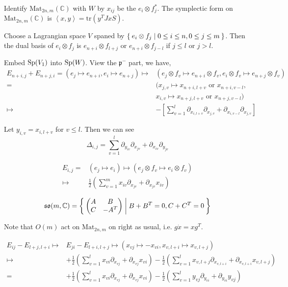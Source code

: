 \documentclass[12pt]{amsart}
\def\Mat{{\rm Mat}}
\def\bC{{\mathbb{C}}}
\def\inn#1#2{\left\langle{#1},{#2}\right\rangle}
\def\Sp{{\rm Sp}}
\def\aso{\mathfrak{so}}
\def\fpp{\mathfrak{p}}
\def\tr{\mathrm{tr}}
\def\Mat{\mathrm{Mat}}
\begin{document}
Identify $\Mat_{2n,m}(\bC)$ with $W$ by $x_{ij}$ be the $e_i\otimes f_j^*$.
The symplectic form on $\Mat_{2n,m}(\bC)$ is $\inn{x}{y} = \tr(y^TJxS)$.

Choose a Lagrangian space $V$ spaned by
$\Set{e_i\otimes f_j|0\leq i\leq n, 0\leq j \leq m}$.
Then the dual basis of $e_i\otimes f_j$ is 
$e_{n+i}\otimes f_{l+j}$ or $e_{n+i} \otimes f_{j-l}$ if $j\leq l$ or $j>l$. 

Embed $\Sp(V_1)$ into $\Sp(W)$. View the $\fpp^-$ part,
we have, 
\begin{align*}
 E_{n+i,j}+ E_{n+j,i} = (e_{j}\mapsto e_{n+i}, e_{i}\mapsto e_{n+j})  
\mapsto& (e_j\otimes f_v \mapsto e_{n+i}\otimes f_v,
 e_i\otimes f_v \mapsto e_{n+j}\otimes f_v)\\
 =&( x_{j,v}\mapsto x_{n+i,l+v}\text{ or } x_{n+i,v-l}, \\
 &x_{i,v}\mapsto x_{n+j,l+v}\text{ or } x_{n+j,v-l})\\
\mapsto& -[
\sum_{v=1}^l\partial_{x_{i,l+v}}\partial_{x_{j,v}} 
+ \partial_{x_{i,v-l}}\partial_{x_{j,v}}]
\end{align*}

Let $y_{i,v} = x_{i,l+v}$ for $v\leq l$.
Then we can see 
\[
\Delta_{i,j} = \sum_{v=1}^l \partial_{y_{iv}}\partial_{x_{jv}}
+ \partial_{x_{iv}}\partial_{y_{jv}}
\] 

\[
\begin{split}
E_{i,j} =& (e_j\mapsto e_i) \mapsto (e_j\otimes f_v \mapsto e_i\otimes f_v)\\
 \mapsto& \frac{1}{2}(\sum_{v=1}^m x_{iv}\partial_{x_{jv}}+ \partial_{x_{jv}}x_{iv}) 
\end{split}
\]

\[
\aso(m,\bC) = \Set{
\begin{pmatrix}
A & B\\
C & -A^T
\end{pmatrix}| B+B^T=0, C+C^T=0}
\]

Note that $O(m)$ act on $\Mat_{2n,m}$ on right as usual,
i.e. $g\dot x = xg^T$.

\[
\begin{split}
E_{ij} - E_{l+j,l+i} \mapsto & E_{ji}-E_{l+i,l+j}
\mapsto (x_{vj}\mapsto -x_{vi}, x_{v,l+i}\mapsto x_{v,l+j})\\
\mapsto & 
+\frac{1}{2}(\sum_{v=1}^l x_{vi}\partial_{x_{vj}}+ \partial_{x_{vj}}x_{vi})
-\frac{1}{2}(\sum_{v=1}^l x_{v,l+j}\partial_{x_{v,l+i}}+ \partial_{x_{v,l+i}} x_{v,l+j})
\\
=&
+\frac{1}{2}(\sum_{v=1}^l x_{vi}\partial_{x_{vj}}+ \partial_{x_{vj}}x_{vi})
-\frac{1}{2}(\sum_{v=1}^l y_{vj}\partial_{y_{vi}}+ \partial_{y_{vi}} y_{vj})
\end{split}
\] 
\end{document}
